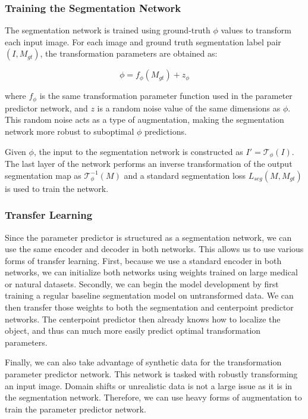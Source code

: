 \subsubsection{Training the Segmentation Network}

The segmentation network is trained using ground-truth $\phi$ values to transform each input image. For each image and ground truth segmentation label pair $(I, M_{gt})$, the transformation parameters are obtained as:

\begin{equation}
	\phi = f_\phi(M_{gt}) + z_\phi
\end{equation}

where $f_\phi$ is the same transformation parameter function used in the parameter predictor network, and $z$ is a random noise value of the same dimensions as $\phi$. This random noise acts as a type of augmentation, making the segmentation network more robust to suboptimal $\phi$ predictions.

Given $\phi$, the input to the segmentation network is constructed as $I' = \mathcal{T}_\phi(I)$. The last layer of the network performs an inverse transformation of the output segmentation map as $\mathcal{T}^{-1}_\phi(M)$ and a standard segmentation loss $L_{seg}(M, M_{gt})$ is used to train the network.

\subsubsection{Transfer Learning}

Since the parameter predictor is structured as a segmentation network, we can use the same encoder and decoder in both networks. This allows us to use various forms of transfer learning. First, because we use a standard encoder in both networks, we can initialize both networks using weights trained on large medical or natural datasets. Secondly, we can begin the model development by first training a regular baseline segmentation model on untransformed data. We can then transfer those weights to both the segmentation and centerpoint predictor networks. The centerpoint predictor then already knows how to localize the object, and thus can much more easily predict optimal transformation parameters.

Finally, we can also take advantage of synthetic data for the transformation parameter predictor network. This network is tasked with robustly transforming an input image. Domain shifts or unrealistic data is not a large issue as it is in the segmentation network. Therefore, we can use heavy forms of augmentation to train the parameter predictor network.

